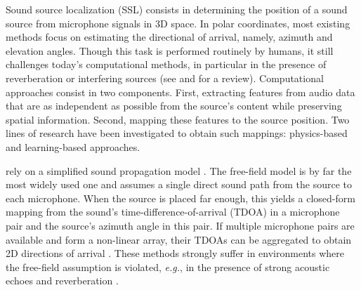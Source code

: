 




Sound source localization (SSL) consists in determining the position of a sound source from microphone signals in 3D space.
In polar coordinates, most existing methods focus on estimating the directional of arrival, namely, azimuth and elevation angles.
Though this task is performed routinely by humans, it still challenges today's computational methods,
in particular in the presence of reverberation or interfering sources (see \cite{rascon2017localization} and \cite{Argentieri2015} for a review).
Computational approaches consist in two components. First, extracting features from audio data that are as independent
as possible from the source's content while preserving spatial information. Second, mapping these features to the source position.
Two lines of research have been investigated to obtain such mappings: physics-based and learning-based approaches.

 rely on a simplified sound propagation model
\cite{rascon2017localization,Knapp1976,DiBiase2001,Lebarbenchon2018}.
The free-field model is by far the most widely used one and assumes
a single direct sound path from the source to each microphone.
When the source is placed far enough, this yields a closed-form mapping from the
sound's time-difference-of-arrival (TDOA) in a microphone pair and the source's azimuth angle in this pair.
If multiple microphone pairs are available and form a non-linear array,
their TDOAs can be aggregated to obtain 2D directions of arrival \cite{DiBiase2001}.
These methods strongly suffer in environments where the free-field assumption is violated,
\textit{e.g.}, in the presence of strong acoustic echoes and reverberation \cite{Scheuing2006}.

